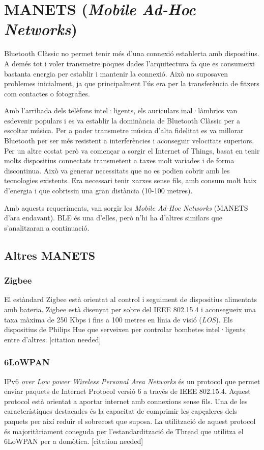 \section{MANETS (\textit{Mobile Ad-Hoc Networks})}
Bluetooth Clàssic no permet tenir més d'una connexió establerta amb dispositius.
A demés tot i voler transmetre poques dades l'arquitectura fa que es consumeixi bastanta energia per establir i mantenir la connexió.
Això no suposaven problemes inicialment, ja que principalment l'ús era per la transferència de fitxers com contactes o fotografies.

Amb l'arribada dels telèfons intel·ligents, els auriculars inal·làmbrics van esdevenir populars i es va establir la dominància de Bluetooth Clàssic per a escoltar música.
Per a poder transmetre música d'alta fidelitat es va millorar Bluetooth per ser més resistent a interferències i aconseguir velocitats superiors.
Per un altre costat però va començar a sorgir el Internet of Things, basat en tenir molts dispositius connectats transmetent a taxes molt variades i de forma discontinua.
Això va generar necessitats que no es podien cobrir amb les tecnologies existents.
Era necessari tenir xarxes sense fils, amb consum molt baix d'energia i que cobrissin una gran distància (10-100 metres).

Amb aquests requeriments, van sorgir les \textit{Mobile Ad-Hoc Networks} (MANETS d'ara endavant). BLE és una d'elles, però n'hi ha d'altres similars que s'analitzaran a continuació.

\subsection{Altres MANETS}

\subsubsection{Zigbee}
El estàndard Zigbee està orientat al control i seguiment de dispositius alimentats amb bateria. Zigbee està disenyat per sobre del IEEE 802.15.4 i aconsegueix una taxa màxima  de 250 Kbps i fins a 100 metres en línia de visió (\textit{LOS}).
Els dispositius de Philips Hue que serveixen per controlar bombetes intel·ligents entre d'altres.
[citation needed]

\subsubsection{6LoWPAN}
IPv6 \textit{over Low power Wireless Personal Area Networks} és un protocol que permet enviar paquets de Internet Protocol versió 6 a través de IEEE 802.15.4.
Aquest protocol està orientat a aportar internet amb connexions sense fils.
Una de les característiques destacades és la capacitat de comprimir les capçaleres dels paquets per així reduir el sobrecost que suposa.
La utilització de aquest protocol és majoritàriament coneguda per l'estandardització de Thread que utilitza el 6LoWPAN per a domòtica. [citation needed]


